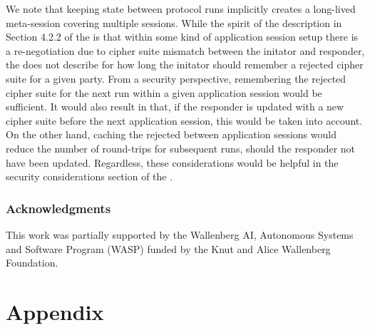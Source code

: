 \documentclass[runningheads,draft,x11names]{llncs}
\begin{document}
We note that keeping state between protocol runs implicitly creates a long-lived
meta-session covering multiple \mEdhoc{} sessions.
%
While the spirit of the description in Section 4.2.2 of the \mSpec{} is that
within some kind of application session setup there is a re-negotiation due to
cipher suite mismatch between the initator and responder, the \mSpec{} does not
describe for how long the initator should remember a rejected cipher suite for a
given party.
%
From a security perspective, remembering the rejected cipher suite for the
next \mEdhoc{} run within a given application session would be sufficient.
%
It would also result in that, if the responder is updated with a new cipher
suite before the next application session, this would be taken into account.
%
On the other hand, caching the rejected between application sessions would
reduce the number of round-trips for subsequent runs, should the responder not
have been updated.
%
Regardless, these considerations would be helpful in the security considerations
section of the \mSpec{}.
%

\subsubsection*{Acknowledgments} This work was partially supported by
the Wallenberg AI, Autonomous Systems and Software Program (WASP) funded by
the Knut and Alice Wallenberg Foundation.
%





\appendix
\section*{Appendix}


\end{document}
